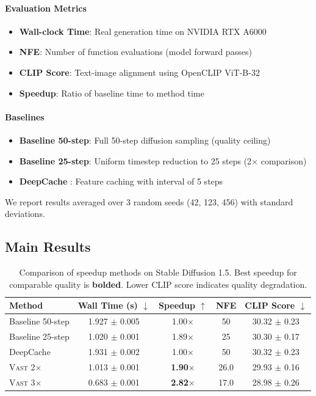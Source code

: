 \documentclass{article}
\newcommand{\vast}{\textsc{Vast}}
\begin{document}
\paragraph{Evaluation Metrics}
\begin{itemize}
    \item \textbf{Wall-clock Time}: Real generation time on NVIDIA RTX A6000
    \item \textbf{NFE}: Number of function evaluations (model forward passes)
    \item \textbf{CLIP Score}: Text-image alignment using OpenCLIP ViT-B-32 \citep{ilharco2021openclip}
    \item \textbf{Speedup}: Ratio of baseline time to method time
\end{itemize}

\paragraph{Baselines}
\begin{itemize}
    \item \textbf{Baseline 50-step}: Full 50-step diffusion sampling (quality ceiling)
    \item \textbf{Baseline 25-step}: Uniform timestep reduction to 25 steps (2$\times$ comparison)
    \item \textbf{DeepCache} \citep{ma2024deepcache}: Feature caching with interval of 5 steps
\end{itemize}

We report results averaged over 3 random seeds (42, 123, 456) with standard deviations.

\subsection{Main Results}

\begin{table}[t]
\caption{Comparison of speedup methods on Stable Diffusion 1.5. Best speedup for comparable quality is \textbf{bolded}. Lower CLIP score indicates quality degradation.}
\label{tab:main}
\centering
\begin{tabular}{lcccc}
\toprule
Method & Wall Time (s) $\downarrow$ & Speedup $\uparrow$ & NFE & CLIP Score $\downarrow$ \\
\midrule
Baseline 50-step & 1.927 $\pm$ 0.005 & 1.00$\times$ & 50 & 30.32 $\pm$ 0.23 \\
Baseline 25-step & 1.020 $\pm$ 0.001 & 1.89$\times$ & 25 & 30.30 $\pm$ 0.17 \\
DeepCache & 1.931 $\pm$ 0.002 & 1.00$\times$ & 50 & 30.32 $\pm$ 0.23 \\
\midrule
\vast{} 2$\times$ & 1.013 $\pm$ 0.001 & \textbf{1.90$\times$} & 26.0 & 29.93 $\pm$ 0.16 \\
\vast{} 3$\times$ & 0.683 $\pm$ 0.001 & \textbf{2.82$\times$} & 17.0 & 28.98 $\pm$ 0.26 \\
\bottomrule
\end{tabular}
\end{table}
\end{document}
